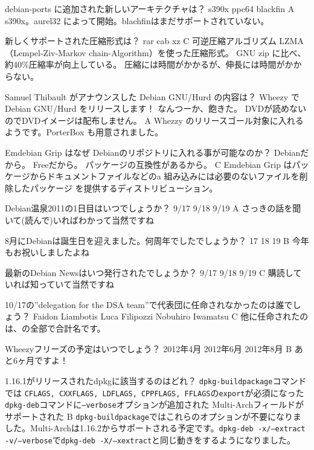 \santaku
{debian-ports に追加された新しいアーキテクチャは？}
{s390x}
{ppc64}
{blackfin}
{A}
{s390x。aurel32 によって開始。blachfinはまだサポートされていない。}

\santaku
{新しくサポートされた圧縮形式は？}
{rar}
{cab}
{xz}
{C}
{可逆圧縮アルゴリズム LZMA
（Lempel-Ziv-Markov chain-Algorithm）を使った圧縮形式。
GNU zip に比べ、
約40\%圧縮率が向上している。
圧縮には時間がかかるが、伸長には時間がかからない。
}

\santaku
{Samuel Thibault がアナウンスした Debian GNU/Hurd の内容は？}
{Wheezy で Debian GNU/Hurd をリリースします！}
{なんつーか、飽きた。}
{DVDが読めないのでDVDイメージは配布しません。}
{A}
{Whezzy のリリースゴール対象に入れるようです。PorterBox も用意されました。}

\santaku
{Emdebian Grip はなぜ Debianのリポジトリに入れる事が可能なのか？}
{Debianだから。}
{Freeだから。}
{パッケージの互換性があるから。}
{C}
{Emdebian Grip はパッケージからドキュメントファイルなどのa 
組み込みには必要のないファイルを削除したパッケージ
を提供するディストリビューション。}

\santaku
{Debian温泉2011の1日目はいつでしょうか？}
{9/17}
{9/18}
{9/19}
{A}
{さっきの話を聞いて(読んで)いればわかって当然ですね}

\santaku
{8月にDebianは誕生日を迎えました。何周年でしたでしょうか？}
{17}
{18}
{19}
{B}
{今年もお祝いしましたよね}

\santaku
{最新のDebian Newsはいつ発行されたでしょうか？}
{9/17}
{9/18}
{9/19}
{C}
{購読していれば知っていて当然ですね}

\santaku
{10/17の''delegation for the DSA team''で代表団に任命されなかったのは誰でしょう？}
{Faidon Liambotis}
{Luca Filipozzi}
{Nobuhiro Iwamatsu}
{C}
{他に任命されたのは、の全部で合計名です。}

\santaku
{Wheezyフリーズの予定はいつでしょう？}
{2012年4月}
{2012年6月}
{2012年8月}
{B}
{あと6ヶ月ですよ！}

\santaku
{1.16.1がリリースされたdpkgに該当するのはどれ？}
{\texttt{dpkg-buildpackage}コマンドでは \texttt{CFLAGS, CXXFLAGS, LDFLAGS, CPPFLAGS, FFLAGS}の\texttt{export}が必須になった}
{\texttt{dpkg-deb}コマンドに\texttt{--verbose}オプションが追加された}
{Multi-Archフィールドがサポートされた}
{B}
{\texttt{dpkg-buildpackage}ではこれらのオプションが不要になりました。Multi-Archは1.16.2からサポートされる予定です。\texttt{dpkg-deb -x/--extract -v/--verbose}で\texttt{dpkg-deb -X/--xextract}と同じ動きをするようになりました。}

